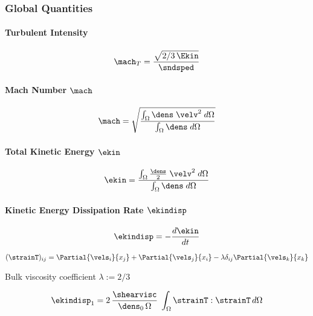 \subsubsection{Global Quantities}

\paragraph{Turbulent Intensity}

\begin{equation}
    \mach_T = \frac{\sqrt{2/3 \, \Ekin}}{\sndsped}
\end{equation}

\paragraph{Mach Number $\mach$}

\begin{equation}
\label{eq:mach}
    \mach = \sqrt{\frac{\int_\Omega \dens \; \velv^2 \; d\Omega}{\int_\Omega \dens \; d\Omega}}
\end{equation}

\paragraph{Total Kinetic Energy $\ekin$}

\begin{equation}
\label{eq:ekin}
    \ekin = \frac{\int_\Omega \frac{\dens}{2} \; \velv^2 \; d\Omega}{\int_\Omega \dens \; d\Omega}
\end{equation}

\paragraph{Kinetic Energy Dissipation Rate $\ekindisp$}

\begin{equation}
\label{eq:ekindisp}
    \ekindisp = -\frac{d\ekin}{dt} 
\end{equation}

\begin{equation}
\label{eq:straintensor}
    (\strainT)_{ij} = \Partial{\vels_i}{x_j} + \Partial{\vels_j}{x_i} - \lambda \delta_{ij} \Partial{\vels_k}{x_k}
\end{equation}

Bulk viscosity coefficient $\lambda := 2/3$

\begin{equation}
\label{eq:ekindisp1}
    \ekindisp_1 = 2\,\frac{\shearvisc}{\dens_0\,\Omega} \; \int_\Omega \strainT : \strainT \, d\Omega
\end{equation}

